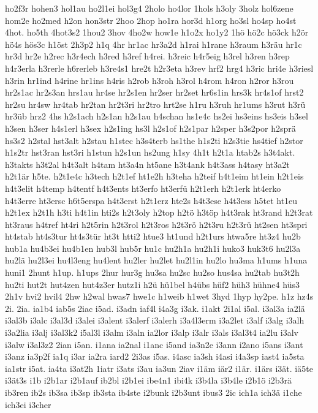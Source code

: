 {ho2f3r
hohen3
hol1au
ho2l1ei
hol3g4
2holo
ho4lor
1hols
h3oly
3holz
hol6zene
hom2e
ho2med
h2on
hon3str
2hoo
2hop
ho1ra
hor3d
h1org
ho3sl
ho4sp
ho4st
4hot.
ho5th
4hot3s2
1hou2
3hov
4ho2w
how1e
h1o2x
ho1y2
1hö
hö2c
hö3ck
h2ör
hö4s
hös3c
h1öst
2h3p2
h1q
4hr
hr1ac
hr3a2d
h1rai
h1rane
h3raum
h3räu
hr1c
hr3d
hr2e
h2rec
h3r4ech
h3red
h3ref
h4rei.
h3reic
h4r5eig
h3rel
h3ren
h3rep
h4r3erla
h3rerle
h6rerleb
h3re4s1
hre2t
h2r3eta
h3rev
hrf2
hrg4
h3ric
hri4e
h3riesl
h3rin
hr1ind
h4rine
hr1ins
h4ris
h2rob
h3roh
h3rol
h4rom
h4ron
h2ror
h3rou
hr2s1ac
hr2s3an
hrs1au
hr4se
hr2s1en
hr2ser
hr2set
hr6s1in
hrs3k
hr4s1of
hrst2
hr2su
hr4sw
hr4tab
hr2tan
hr2t3ri
hr2tro
hrt2se
h1ru
h3ruh
hr1ums
h3rut
h3rü
hr3üb
hrz2
4hs
h2s1ach
h2s1an
h2s1au
h4schan
hs1e4c
hs2ei
hs3eins
hs3eis
h3sel
h3sen
h3ser
h4s1erl
h3sex
h2s1ing
hs3l
h2s1of
h2s1par
h2sper
h3s2por
h2sprä
hs3s2
h2stal
hst3alt
h2stau
h1stec
h3s4terb
hs1the
h1s2ti
h2s3tie
hs4tief
h2stor
h1s2tr
hst3ran
hst3ri
h1stun
h2s1un
hs2ung
h1sy
4h1t
h2t1a
htab2s
h3t4akt.
h3takts
h3t2al
h4t3alt
h4tam
ht3a4n
ht5ane
h3t4ank
h4t3ass
h4tasy
ht3a2t
h2t1är
h5te.
h2t1e4c
h3tech
h2t1ef
ht1e2h
h3teha
h2teif
h4t1eim
ht1ein
h2t1eis
h4t3elit
h4temp
h4tentf
h4t3ents
ht3erfo
ht3erfü
h2t1erh
h2t1erk
ht4erko
h4t3erre
ht3ersc
h6t5erspa
h4t3erst
h2t1erz
hte2s
h4t3ese
h4t3ess
h5tet
ht1eu
h2t1ex
h2t1h
h3ti
h4t1in
hti2s
h2t3oly
h2top
h2tö
h3töp
h4t3rak
ht3rand
h2t3rat
ht3raus
h4tref
ht4ri
h2t5rin
h2t3rol
h2t3ros
h2t3rö
h2t3ru
h2t3rü
ht2sen
ht3spri
ht4stab
ht4s3tur
ht4s3tür
ht3t
htti2
htue3
ht1und
h2t1urs
htwa5re
ht3z4
hu2b
hub1a
hu4b3ei
hu4b1en
hub3l
hub5r
hu1c
hu2h1a
hu2h1i
huko3
huk3t6
hu2l3a
hu2lä
hu2l3ei
hu4l3eng
hu4lent
hu2ler
hu2let
hu2l1in
hu2lo
hu3ma
h1ums
h1una
huni1
2hunt
h1up.
h1ups
2hur
hur3g
hu3sa
hu2sc
hu2so
hus4sa
hu2tab
hu3t2h
hu2ti
hut2t
hut4zen
hut4z3er
hutz1i
h2ü
hü1bel
h4übs
hüf2
hüh3
hühne4
hüs3
2h1v
hvi2
hvil4
2hw
h2wal
hwas7
hwe1c
h1weib
h1wet
3hyd
1hyp
hy2pe.
h1z
hz4s
2i.
2ia.
ia1b4
iab5s
2iac
i5ad.
i3adn
iaf4l
i4a3g
i3ak.
i1akt
2i1al
i5al.
i3al3a
ia2lä
i3al3b
i3alc
i3al3d
i3alei
i3alent
i3alerf
i3alerh
i3a4l3erm
i3a2let
i3alf
i3alg
i3alh
i3a2lia
i3alj
i3al3k2
i5al3l
i3alm
i3aln
ia2lor
i3alp
i3alr
i3als
i3al3t4
ia2lu
i3alv
i3alw
i3al3z2
2ian
i5an.
i1ana
ia2nal
i1anc
i5and
ia3n2e
i3ann
i2ano
i5ans
i3ant
i3anz
ia3p2f
ia1q
i3ar
ia2ra
iard2
2i3as
i5as.
i4asc
ia3sh
i4asi
i4a3sp
iast4
ia5sta
ia1str
i5at.
ia4ta
i3at2h
1iatr
i3ats
i3au
ia3un
2iav
i1äm
iär2
i1är.
i1ärs
i3ät.
iä5te
i3ät3s
i1b
i2b1ar
i2b1auf
ib2bl
i2b1ei
ibe4n1
ibi4k
i3b4la
i3b4le
i2b1ö
i2b3rä
ib3ren
ib2s
ib3sa
ib3sp
ib3sta
ib4ste
i2bunk
i2b3unt
ibus3
2ic
ich1a
ich3ä
i1che
ich3ei
i3cher
}
